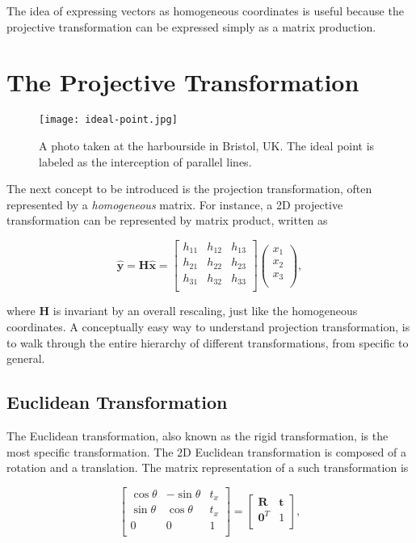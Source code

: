 \documentclass[11pt,twoside]{report}
\begin{document}
 The idea of expressing vectors as homogeneous coordinates is useful because the projective transformation can be expressed simply as a matrix production.
 
 \section{The Projective Transformation}
 
 \begin{SCfigure}
  \texttt{[image: ideal-point.jpg]}
  \caption{A photo taken at the harbourside in Bristol, UK. The ideal point is labeled as the interception of parallel lines.}
  \label{fig:ideal-point}
\end{SCfigure}
 
The next concept to be introduced is the projection transformation, often represented by a \emph{homogeneous} matrix. For instance, a 2D projective transformation can be represented by matrix product, written as

$$
\hat{\mathbf{y}} = \mathbf{H} \hat{\mathbf{x}} = 
\left[
\begin{matrix}
	h_{11} & h_{12} & h_{13}\\
	h_{21} & h_{22} & h_{23}\\
	h_{31} & h_{32} & h_{33}\\
\end{matrix}
\right]
\left(
\begin{matrix}
	x_{1}\\ x_{2}\\ x_{3}\\
\end{matrix}
\right),
$$

\noindent where $\mathbf{H}$ is invariant by an overall rescaling, just like the homogeneous coordinates. A conceptually easy way to understand projection transformation, is to walk through the entire hierarchy of different transformations, from specific to general.
 
 \subsection{Euclidean Transformation}
 
 The Euclidean transformation, also known as the rigid transformation, is the most specific transformation. The 2D Euclidean transformation is composed of a rotation and a translation. The matrix representation of a such transformation is
 
$$
\begin{bmatrix}
	\cos\theta & -\sin\theta & t_{x}\\
	\sin\theta & \cos\theta & t_{x}\\
	0 & 0 & 1\\
\end{bmatrix} =
\begin{bmatrix}
	\mathbf{R} & \mathbf{t}\\
	\mathbf{0}^T & 1\\
\end{bmatrix},
$$
\end{document}
